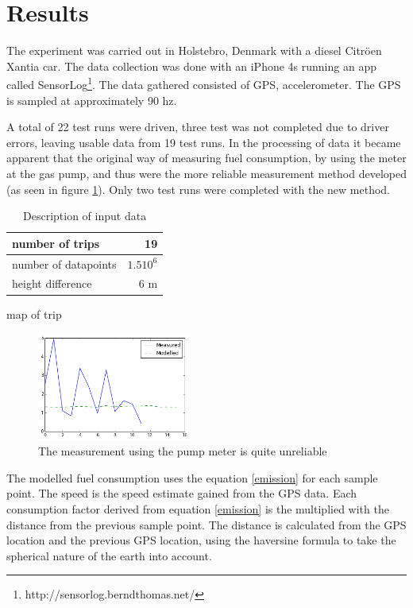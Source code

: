 \section{Results}
\label{sec:results}

The experiment was carried out in Holstebro, Denmark with a diesel Citr\"oen Xantia car. The data collection was done with an iPhone 4s running an app called SensorLog\footnote{http://sensorlog.berndthomas.net/}. The data gathered consisted of GPS, accelerometer. The GPS is sampled at approximately 90 hz.

A total of 22 test runs were driven, three test was not completed due to driver errors, leaving
usable data from 19 test runs. In the processing of data it became apparent that the original way of measuring fuel consumption, by using the meter at the gas pump, and thus were the more reliable measurement method developed (as seen in figure \ref{measured}). Only two test runs were completed with the new method.

\begin{table}
\begin{tabular}{| l | r |}
\hline 
number of trips & 19 \\[0.1cm] \hline
number of datapoints & $1.5 10^6$\\[0.1cm] \hline
height difference & 6 m\\[0.1cm]
\hline 

\end{tabular}
\label{datatable}
\caption{Description of input data}
\end{table}
map of trip

\begin{figure}[h]
	\centering
	\includegraphics[width=0.45\textwidth]{Measured_consumption}
  \caption{The measurement using the pump meter is quite unreliable}
  \label{measured}
\end{figure}

The modelled fuel consumption uses the equation \ref{emission} for each sample point. The speed is the speed estimate gained from the GPS data. Each consumption factor derived from  equation \ref{emission} is the multiplied with the distance from the previous sample point. The distance is calculated from the GPS location and the previous GPS location, using the haversine formula \cite{rick1999deriving} to take the spherical nature of the earth into account.

